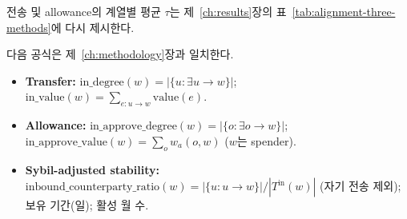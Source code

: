 
전송 및 allowance의 계열별 평균 $\tau$는 제~\ref{ch:results}장의 표~\ref{tab:alignment-three-methods}에 다시 제시한다.


\begin{table}[htbp]
\centering
\caption{주 평가에 사용된 기본 매개변수.}
\label{tab:parameter-summary}
\end{table}


다음 공식은 제~\ref{ch:methodology}장과 일치한다.

\begin{itemize}
\item \textbf{Transfer:} $\mathrm{in\_degree}(w)=|\{u:\exists u\to w\}|$; $\mathrm{in\_value}(w)=\sum_{e:u\to w}\mathrm{value}(e)$.

\item \textbf{Allowance:} $\mathrm{in\_approve\_degree}(w)=|\{o:\exists o\to w\}|$; $\mathrm{in\_approve\_value}(w)=\sum_o w_a(o,w)$ ($w$는 spender).

\item \textbf{Sybil-adjusted stability:} $\mathrm{inbound\_counterparty\_ratio}(w)=|\{u:u\to w\}|/|T^{\mathrm{in}}(w)|$ (자기 전송 제외); 보유 기간(일); 활성 월 수.
\end{itemize}


